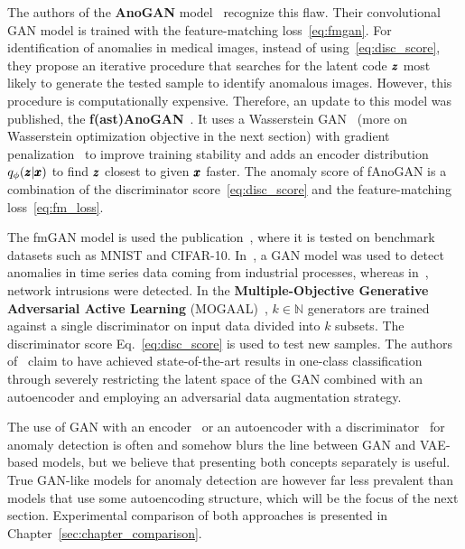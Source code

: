 The authors of the \textbf{AnoGAN} model~\cite{schlegl2017unsupervised} recognize this flaw. Their convolutional GAN model is trained with the feature-matching loss~\eqref{eq:fmgan}. For identification of anomalies in medical images, instead of using~\eqref{eq:disc_score}, they propose an iterative procedure that searches for the latent code $\pmb{{z}}$ most likely to generate the tested sample to identify anomalous images. However, this procedure is computationally expensive. Therefore, an update to this model was published, the \textbf{f(ast)AnoGAN}~\cite{schleglFAnoGANFastUnsupervised2019}. It uses a Wasserstein GAN~\cite{gulrajani2017improved,haloui2018anomaly} (more on Wasserstein optimization objective in the next section) with gradient penalization~\cite{gulrajani2017improved} to improve training stability and adds an encoder distribution $q_{\phi}(\pmb{{z}}|\pmb{{x}})$ to find $\pmb{{z}}$ closest to given $\pmb{{x}}$ faster. The anomaly score of fAnoGAN is a combination of the discriminator score~\eqref{eq:disc_score} and the feature-matching loss~\eqref{eq:fm_loss}. 

The fmGAN model is used the publication~\cite{kliger2018novelty}, where it is tested on benchmark datasets such as MNIST and CIFAR-10. In~\cite{wang2018generative}, a GAN model was used to detect anomalies in time series data coming from industrial processes, whereas in~\cite{zenatiEfficientGANBasedAnomaly2018}, network intrusions were detected. In the \textbf{Multiple-Objective Generative Adversarial Active Learning} (MOGAAL)~\cite{liu2019generative}, $k \in \mathbb{N}$ generators are trained against a single discriminator on input data divided into $k$ subsets. The discriminator score Eq.~\eqref{eq:disc_score} is used to test new samples. The authors of~\cite{perera2019ocgan} claim to have achieved state-of-the-art results in one-class classification through severely restricting the latent space of the
GAN combined with an autoencoder and employing an adversarial data augmentation strategy. 

The use of GAN with an encoder~\cite{donahue2016adversarial} or an autoencoder with a discriminator~\cite{leveau2017adversarial} for anomaly detection is often and somehow blurs the line between GAN and VAE-based models, but we believe that presenting both concepts separately is useful. True GAN-like models for anomaly detection are however far less prevalent than models that use some autoencoding structure, which will be the focus of the next section. Experimental comparison of both approaches is presented in Chapter~\ref{sec:chapter_comparison}.


